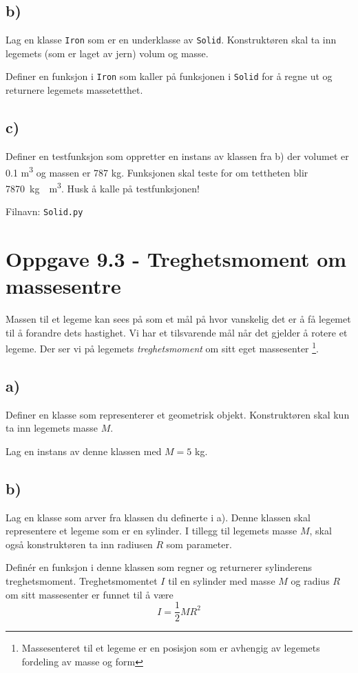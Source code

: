 \documentclass[10pt,a4paper]{article}
\begin{document}
\subsection*{b)}
Lag en klasse \texttt{Iron} som er en underklasse av \texttt{Solid}. Konstruktøren skal ta inn legemets (som er laget av jern) volum og masse. 
 
Definer en funksjon i \texttt{Iron} som kaller på funksjonen i \texttt{Solid} for å regne ut og returnere legemets massetetthet.
 
 \subsection*{c)}
 Definer en testfunksjon som oppretter en instans av klassen fra b) der volumet er 0.1  \si{\cubic\meter} og massen er 787 kg. Funksjonen skal teste for om tettheten blir \SI{7870}{\kg.\per\cubic\meter}. Husk å kalle på testfunksjonen!
 
 Filnavn: \texttt{Solid.py}
 
 \section*{Oppgave 9.3 - Treghetsmoment om massesentre}
 Massen til et legeme kan sees på som et mål på hvor vanskelig det er å få legemet til å forandre dets hastighet. Vi har et tilsvarende mål når det gjelder å rotere et legeme. Der ser vi på legemets \textit{treghetsmoment} om sitt eget massesenter \footnote{ Massesenteret til et legeme er en posisjon som er avhengig av legemets fordeling av masse og form}.
 
 
\subsection*{a)}
Definer en klasse som representerer et geometrisk objekt. Konstruktøren skal kun ta inn legemets masse $M$. 
 
Lag en instans av denne klassen med $M = 5$ kg. 
\subsection*{b)}
Lag en klasse som arver fra klassen du definerte i a). Denne klassen skal representere et legeme som er en sylinder. I tillegg til legemets masse $M$, skal også konstruktøren ta inn radiusen $R$ som parameter. 
 
Definér en funksjon i denne klassen som regner og returnerer sylinderens treghetsmoment. Treghetsmomentet $I$ til en sylinder med masse $M$ og radius $R$ om sitt massesenter er funnet til å være
\[
I = \frac{1}{2}MR^2
\] 
 
\end{document}
